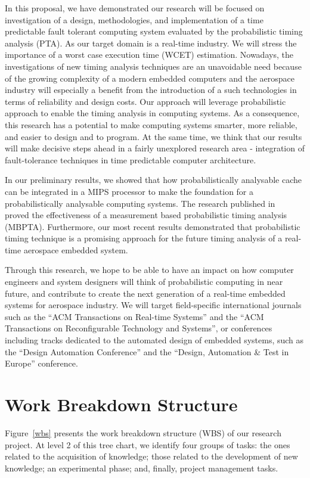 \label{sec:conclusions} 

In this proposal, we have demonstrated our research will be focused on investigation of a design, methodologies, and implementation of a time predictable fault tolerant computing system evaluated by the probabilistic timing analysis (PTA). As our target domain is a real-time industry. We will stress the importance of a worst case execution time (WCET) estimation.
Nowadays, the investigations of new timing analysis techniques are an unavoidable need because of the growing complexity of a modern embedded computers and the aerospace industry will especially a benefit from the introduction of a such technologies in terms of  reliability and design costs. Our approach will leverage probabilistic approach to enable the timing analysis in computing systems.
As a consequence, this research has a potential to make computing systems smarter, more reliable, and easier to design and to program. At the same time, we think that our results will make decisive steps ahead in a fairly unexplored research area - integration of fault-tolerance techniques in time predictable computer architecture.


In our preliminary results, we showed that how probabilistically analysable cache can be integrated in a MIPS processor to make the foundation for a probabilistically analysable computing systems. The research published in~\cite{NEWCAS} proved the effectiveness of a measurement based probabilistic timing analysis (MBPTA). Furthermore, our most recent results demonstrated that probabilistic timing technique is a promising approach for the future timing analysis of a real-time aerospace embedded system.

Through this research, we hope to be able to have an impact on how computer engineers and system designers will think of probabilistic computing in near future, and contribute to create the next generation of a real-time embedded systems for aerospace industry.
We will target field-specific international  journals such as the ``ACM Transactions on Real-time  Systems'' and the ``ACM Transactions on Reconfigurable Technology and Systems'', or conferences including tracks dedicated to the automated design of embedded systems, such as the ``Design Automation Conference'' and the ``Design, Automation \& Test in Europe'' conference.

\section{Work Breakdown Structure}
Figure~\ref{wbs} presents the work breakdown structure (WBS) of our research project. At level 2 of this tree chart, we identify four groups of tasks: the ones related to the acquisition of knowledge; those related to the development of new knowledge; an experimental phase; and, finally, project management tasks.

